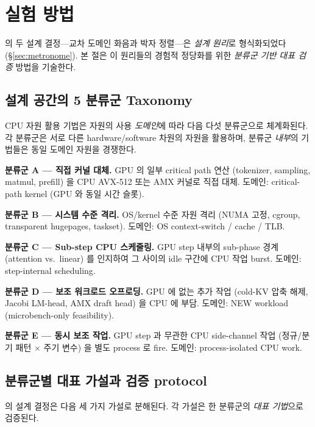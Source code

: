 
\section{실험 방법}
\label{sec:methodology}

\algname 의 두 설계 결정---교차 도메인 화음과 박자 정렬---은 \emph{설계 원리}로 형식화되었다 (\S\ref{sec:metronome}).
본 절은 이 원리들의 경험적 정당화를 위한 \emph{분류군 기반 대표 검증} 방법을 기술한다.

\subsection{설계 공간의 5 분류군 Taxonomy}
\label{subsec:taxonomy}

CPU 자원 활용 기법은 자원의 사용 \emph{도메인}에 따라 다음 다섯 분류군으로 체계화된다.
각 분류군은 서로 다른 hardware/software 차원의 자원을 활용하며, 분류군 \emph{내부}의 기법들은 동일 도메인 자원을 경쟁한다.

\textbf{분류군 A --- 직접 커널 대체.}
GPU 의 일부 critical path 연산 (tokenizer, sampling, matmul, prefill) 을 CPU AVX-512 또는 AMX 커널로 직접 대체.
도메인: critical-path kernel (GPU 와 동일 시간 슬롯).

\textbf{분류군 B --- 시스템 수준 격리.}
OS/kernel 수준 자원 격리 (NUMA 고정, cgroup, transparent hugepages, taskset).
도메인: OS context-switch / cache / TLB.

\textbf{분류군 C --- Sub-step CPU 스케줄링.}
GPU step 내부의 sub-phase 경계 (attention vs.\ linear) 를 인지하여 그 사이의 idle 구간에 CPU 작업 burst.
도메인: step-internal scheduling.

\textbf{분류군 D --- 보조 워크로드 오프로딩.}
GPU 에 없는 추가 작업 (cold-KV 압축 해제, Jacobi LM-head, AMX draft head) 을 CPU 에 부담.
도메인: NEW workload (microbench-only feasibility).

\textbf{분류군 E --- 동시 보조 작업.}
GPU step 과 무관한 CPU side-channel 작업 (정규/분기 패턴 $\times$ 주기 변수) 을 별도 process 로 fire.
도메인: process-isolated CPU work.

\subsection{분류군별 대표 가설과 검증 protocol}
\label{subsec:hypotheses}

\algname 의 설계 결정은 다음 세 가지 가설로 분해된다.
각 가설은 한 분류군의 \emph{대표 기법}으로 검증된다.

